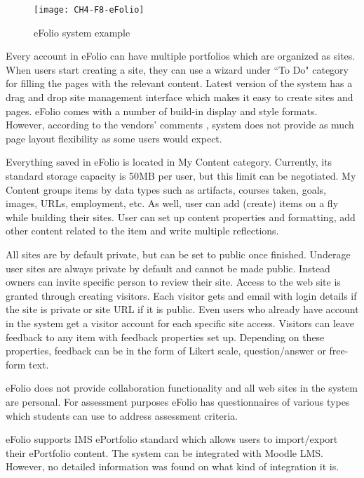 \begin{figure}[htb]
\centering
\setlength\fboxsep{0pt}
\setlength\fboxrule{0.5pt}
\texttt{[image: CH4-F8-eFolio]}
\caption[eFolio system example]{eFolio system example \citep{EFolioMinnesota2011}}
\label{fig:efolio}
\end{figure}

Every account in eFolio can have multiple portfolios which are organized as
sites. When users start creating a site, they can use a wizard under ``To Do"
category for filling the pages with the relevant content. Latest version of
the system has a drag and drop site management interface which makes it easy to
create sites and pages. eFolio comes with a number of build-in display and style
formats. However, according to the vendors' comments \citep{AAEEBL2011}, system
does not provide as much page layout flexibility as some users would expect.

Everything saved in eFolio is located in My Content category. Currently, its
standard storage capacity is 50MB per user, but this limit can be negotiated. My
Content groups items by data types such as artifacts, courses taken, goals, images,
URLs, employment, etc. As well, user can add (create) items on a fly while
building their sites. User can set up content properties and formatting, add
other content related to the item and write multiple reflections.

All sites are by default private, but can be set to public once finished.
Underage user sites are always private by default and cannot be made public.
Instead owners can invite specific person to review their site. Access to the
web site is granted through creating visitors. Each visitor gets and
email with login details if the site is private or site URL if it is
public. Even users who already have account in the system get a visitor
account for each specific site access. Visitors can leave feedback to any item
with feedback properties set up. Depending on these properties, feedback can be
in the form of Likert scale, question/answer or free-form text.

eFolio does not provide collaboration functionality and all web sites in the
system are personal. For assessment purposes eFolio has questionnaires of
various types which students can use to address assessment criteria.

eFolio supports IMS ePortfolio standard which allows users to import/export
their ePortfolio content. The system can be integrated with Moodle LMS. However,
no detailed information was found on what kind of integration it is.

